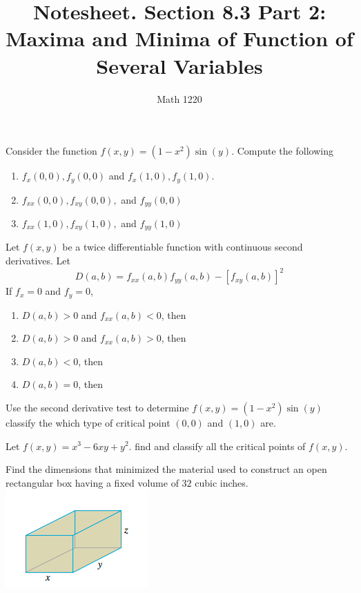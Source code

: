 \documentclass[12pt, a4paper]{article}
\author{Math 1220}
\title{Notesheet. Section 8.3 Part 2: Maxima and Minima of Function of
  Several Variables}
\date{}
\begin{document}
\maketitle
\nameline
\vspace{-0.3in}
\begin{ex}
  Consider the function \(f(x,y) = (1-x^2) \sin(y)\). Compute the
  following
  \begin{enumerate}
  \item \(f_x(0,0), f_y(0,0)\) and \(f_x(1,0),f_y(1,0)\).
    \vspace{0.75in}
  \item \(f_{xx}(0,0), f_{xy}(0,0), \) and \(f_{yy}(0,0)\)
    \vspace{0.75in}
  \item \(f_{xx}(1,0), f_{xy}(1,0),\) and \(f_{yy}(1,0)\)
  \end{enumerate}
\end{ex}
\vspace{-1.5in}
\begin{thrm}
  Let \(f(x,y)\) be a twice differentiable function with continuous
  second derivatives. Let \[
    D(a,b) = f_{xx}(a,b)f_{yy}(a,b) - [f_{xy}(a,b)]^2
  \]
  If \(f_x = 0\) and \(f_y = 0\),
  \begin{enumerate}[label=(\alph*)]
  \item \(D(a,b) > 0\) and \(f_{xx}(a,b) < 0\), then
    \vspace{0.075in}
  \item \(D(a,b) > 0\) and \(f_{xx}(a,b) > 0\), then
    \vspace{0.075in}
  \item \(D(a,b) < 0\), then
    \vspace{0.075in}
  \item \(D(a,b) = 0\), then
  \end{enumerate}
\end{thrm}
\vspace{-0.5in}
\begin{ex}
  Use the second derivative test to determine \(f(x,y) =
  (1-x^2)\sin(y)\) classify the which type of critical point \((0,0)\) and
  \((1,0)\) are.
\end{ex}
\begin{ex}
  Let \(f(x,y) = x^3-6xy+y^2\). find and classify all the critical
  points of \(f(x,y)\).
\end{ex}
\begin{ex}
  Find the dimensions that minimized the material used to construct an
  open rectangular box having a fixed volume 
  of \(32\) cubic inches.
  \\ \includegraphics[scale=0.75]{images/open-box}
\end{ex}
\end{document}
